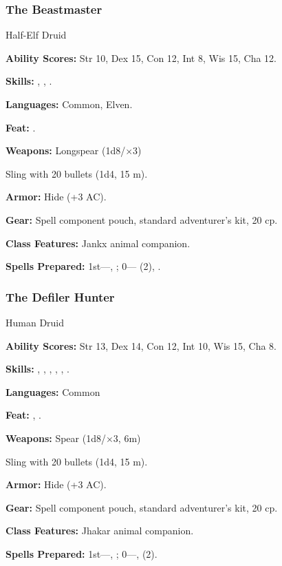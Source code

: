\subsubsection{The Beastmaster}

Half-Elf Druid

\textbf{Ability Scores:} Str 10, Dex 15, Con 12, Int 8, Wis 15, Cha 12.

\textbf{Skills:} , , .

\textbf{Languages:} Common, Elven.

\textbf{Feat:} .

\textbf{Weapons:} Longspear (1d8/$\times$3)

Sling with 20 bullets (1d4, 15 m).

\textbf{Armor:} Hide (+3 AC).

\textbf{Gear:} Spell component pouch, standard adventurer's kit, 20 cp.

\textbf{Class Features:} Jankx animal companion.

\textbf{Spells Prepared:} 1st---, ; 0--- (2), .

\subsubsection{The Defiler Hunter}

Human Druid

\textbf{Ability Scores:} Str 13, Dex 14, Con 12, Int 10, Wis 15, Cha 8.

\textbf{Skills:} , , , , , .

\textbf{Languages:} Common

\textbf{Feat:} , .

\textbf{Weapons:} Spear (1d8/$\times$3, 6m)

Sling with 20 bullets (1d4, 15 m).

\textbf{Armor:} Hide (+3 AC).

\textbf{Gear:} Spell component pouch, standard adventurer's kit, 20 cp.

\textbf{Class Features:} Jhakar animal companion.

\textbf{Spells Prepared:} 1st---, ;\hskip10pt 0---,  (2).

